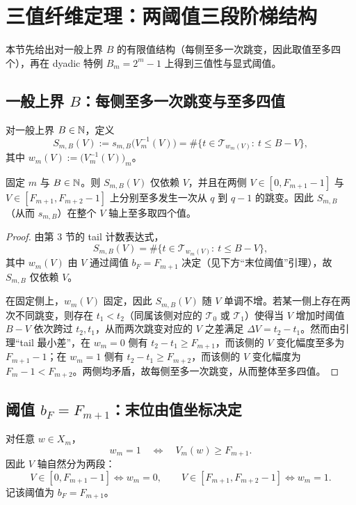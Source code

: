 
\section{三值纤维定理：两阈值三段阶梯结构}

本节先给出对一般上界 $B$ 的有限值结构（每侧至多一次跳变，因此取值至多四个），再在 dyadic 特例 $B_m=2^m-1$ 上得到三值性与显式阈值。

\subsection{一般上界 \texorpdfstring{$B$}{B}：每侧至多一次跳变与至多四值}

对一般上界 $B\in\mathbb{N}$，定义
$$
S_{m,B}(V):=s_{m,B}\big(V_m^{-1}(V)\big)
=\#\Big\{t\in\mathcal{T}_{w_m(V)}:\ t\le B-V\Big\},
$$
其中 $w_m(V):=\big(V_m^{-1}(V)\big)_m$。

\begin{proposition}[一般上界的单跳变结构]\label{prop:general-B-one-jump}
固定 $m$ 与 $B\in\mathbb{N}$。则 $S_{m,B}(V)$ 仅依赖 $V$，并且在两侧 $V\in[0,F_{m+1}-1]$ 与 $V\in[F_{m+1},F_{m+2}-1]$ 上分别至多发生一次从 $q$ 到 $q-1$ 的跳变。因此 $S_{m,B}$（从而 $s_{m,B}$）在整个 $V$ 轴上至多取四个值。
\end{proposition}

\begin{proof}
由第 3 节的 tail 计数表达式，
$$
S_{m,B}(V)=\#\{t\in\mathcal{T}_{w_m(V)}:\ t\le B-V\},
$$
其中 $w_m(V)$ 由 $V$ 通过阈值 $b_F=F_{m+1}$ 决定（见下方“末位阈值”引理），故 $S_{m,B}$ 仅依赖 $V$。

在固定侧上，$w_m(V)$ 固定，因此 $S_{m,B}(V)$ 随 $V$ 单调不增。若某一侧上存在两次不同跳变，则存在 $t_1<t_2$（同属该侧对应的 $\mathcal{T}_0$ 或 $\mathcal{T}_1$）使得当 $V$ 增加时阈值 $B-V$ 依次跨过 $t_2,t_1$，从而两次跳变对应的 $V$ 之差满足 $\Delta V=t_2-t_1$。然而由引理“tail 最小差”，在 $w_m=0$ 侧有 $t_2-t_1\ge F_{m+1}$，而该侧的 $V$ 变化幅度至多为 $F_{m+1}-1$；在 $w_m=1$ 侧有 $t_2-t_1\ge F_{m+2}$，而该侧的 $V$ 变化幅度为 $F_m-1<F_{m+2}$。两侧均矛盾，故每侧至多一次跳变，从而整体至多四值。
\end{proof}

\subsection{阈值 \texorpdfstring{$b_F=F_{m+1}$}{b\_F=F\_{m+1}}：末位由值坐标决定}

\begin{lemma}[末位阈值]
对任意 $w\in X_m$，
$$
w_m=1\quad\Longleftrightarrow\quad V_m(w)\ge F_{m+1}.
$$
因此 $V$ 轴自然分为两段：
$$
V\in[0,F_{m+1}-1]\iff w_m=0,\qquad
V\in[F_{m+1},F_{m+2}-1]\iff w_m=1.
$$
记该阈值为 $b_F=F_{m+1}$。
\end{lemma}

